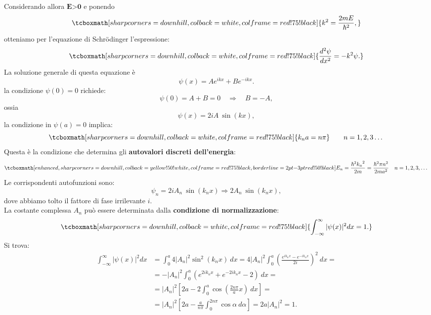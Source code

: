 \documentclass[a4paper,12pt,oneside]{book}
\begin{document}
Considerando allora $\textbf{E>0}$ e ponendo
	\begin{equation}
		\tcboxmath[sharp corners=downhill, colback=white, colframe=red!75!black]{
			k ^2 = \frac{2mE}{\hbar ^2},
			}
	\end{equation}
otteniamo per l'equazione di Schr\"{o}dinger l'espressione:
	\begin{equation}
		\tcboxmath[sharp corners=downhill, colback=white, colframe=red!75!black]{
			\frac{d^2 \psi}{dx^2}=-k ^2\psi.
			}
	\end{equation}
La soluzione generale di questa equazione è
	\begin{equation}
		\psi(x)= Ae^{ik x}+ Be^{-ik x}.
	\end{equation}
la condizione $\psi (0)=0$ richiede:
	\begin{equation}
		\psi(0)= A+ B=0 \quad \Rightarrow \quad B=-A,
	\end{equation}
ossia
	\begin{equation}
		\psi(x)= 2iA\ \sin{\left( k x \right)},
	\end{equation}
la condizione in $\psi (a)=0$ implica:
	\begin{equation}
		\tcboxmath[sharp corners=downhill, colback=white, colframe=red!75!black]{
			k_n a= n\pi
			} \qquad n=1,2,3\dots			
	\end{equation}
Questa è la condizione che determina gli \textbf{autovalori discreti dell'energia}:
	\begin{equation}
		\tcboxmath[enhanced, sharp corners=downhill, colback=yellow!50!white, colframe=red!75!black, borderline={2pt}{-3pt}{red!50!black}]{
			E_n= \frac{\hbar ^2 {k_n}^2}{2m}=\frac{\hbar ^2 \pi n^2}{2ma^2}
			} \quad n=1,2,3,\dots
	\end{equation}
Le corrispondenti autofunzioni sono:
	\begin{equation}
		\psi _n = 2iA_n\ \sin{\left( k_n x\right)} \Rightarrow 2A_n\ \sin{\left( k_n x \right)},
	\end{equation}
dove abbiamo tolto il fattore di fase irrilevante $i$.\\
La costante complessa $A_n$ può essere determinata dalla \textbf{condizione di normalizzazione}:
	\begin{equation}
		\tcboxmath[sharp corners=downhill, colback=white, colframe=red!75!black]{
			\int _{-\infty} ^{\infty} |\psi(x)| ^2 dx =1.
			}
	\end{equation}
Si trova:
	\begin{align}
		\int _{-\infty} ^{\infty} |\psi(x)| ^2 dx &= \int _{0} ^{a} 4|A_n| ^2 \sin ^2 {\left( k_n x \right)}\ dx= 4|A_n| ^2 \int _{0} ^{a} \left( \frac{e^{ik_n x}- e^{-ik_nx}}{2i}\right) ^2\ dx = \nonumber \\ 
		&= -|A_n| ^2 \int _{0} ^{a} \left( e^{2ik_n x}+ e^{-2ik_nx}-2\right)\  dx = \nonumber \\
		&= |A_n| ^2 \left[ 2a- 2 \int _{0} ^{a} \cos \left(\frac{2n \pi}{a} x\right)\   dx \right] = \nonumber \\
		&= |A_n| ^2 \left[ 2a- \frac{a}{n\pi} \int _{0} ^{2n\pi} \cos \alpha\   d\alpha \right] = 2a|A_n|^2= 1.
	\end{align}
\end{document}
